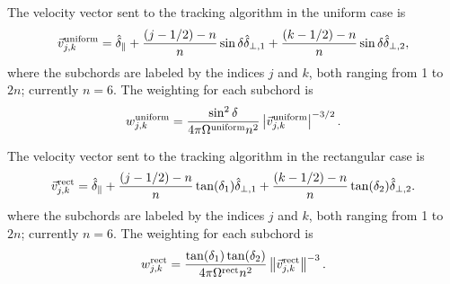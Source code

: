 \documentclass[12pt]{report}
\begin{document}
The velocity vector sent to the tracking algorithm in the uniform
case is
\begin{equation}
\vec{v}_{j,k}^{\rm uniform} = \hat{\delta}_{\parallel}
+ \frac{(j - 1/2) - n}{n} \sin \delta \hat{\delta}_{\perp,1}
+ \frac{(k - 1/2) - n}{n} \sin \delta \hat{\delta}_{\perp,2},
\end{equation}
where the subchords are labeled by the indices $j$ and $k$,
both ranging from 1 to $2n$; currently $n = 6$.
The weighting for each subchord is
\begin{equation}
w_{j,k}^{\rm uniform} = \frac{\sin^{2} \delta}{4 \pi \Omega^{\rm uniform}
n^{2}}\left| \vec{v}_{j,k}^{\rm uniform} \right|^{-3/2}.
\end{equation}


The velocity vector sent to the tracking algorithm in the rectangular
case is
\begin{equation}
\vec{v}_{j,k}^{\rm rect} = \hat{\delta}_{\parallel}
+ \frac{(j - 1/2) - n}{n} \tan(\delta_1) \hat{\delta}_{\perp,1}
+ \frac{(k - 1/2) - n}{n} \tan(\delta_2) \hat{\delta}_{\perp,2}.
\end{equation}
where the subchords are labeled by the indices $j$ and $k$,
both ranging from 1 to $2n$; currently $n = 6$.
The weighting for each subchord is
\begin{equation}
w_{j,k}^{\rm rect} = \frac{\tan(\delta_1)\tan(\delta_2)}{4 \pi
\Omega^{\rm rect} n^{2}}\left\Vert \vec{v}_{j,k}^{\rm rect} \right\Vert^{-3}.
\end{equation}
\end{document}
